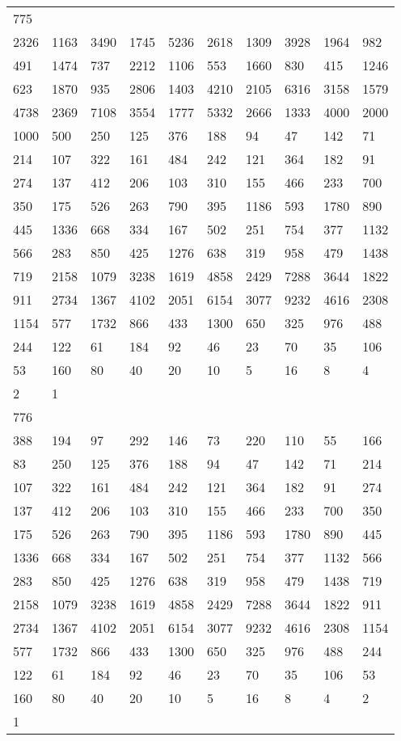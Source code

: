 \begin{longtable}{*{10}{l}}
775&&&&&&&&&\\
2326& 1163& 3490& 1745& 5236& 2618& 1309& 3928& 1964& 982\\
491& 1474& 737& 2212& 1106& 553& 1660& 830& 415& 1246\\
623& 1870& 935& 2806& 1403& 4210& 2105& 6316& 3158& 1579\\
4738& 2369& 7108& 3554& 1777& 5332& 2666& 1333& 4000& 2000\\
1000& 500& 250& 125& 376& 188& 94& 47& 142& 71\\
214& 107& 322& 161& 484& 242& 121& 364& 182& 91\\
274& 137& 412& 206& 103& 310& 155& 466& 233& 700\\
350& 175& 526& 263& 790& 395& 1186& 593& 1780& 890\\
445& 1336& 668& 334& 167& 502& 251& 754& 377& 1132\\
566& 283& 850& 425& 1276& 638& 319& 958& 479& 1438\\
719& 2158& 1079& 3238& 1619& 4858& 2429& 7288& 3644& 1822\\
911& 2734& 1367& 4102& 2051& 6154& 3077& 9232& 4616& 2308\\
1154& 577& 1732& 866& 433& 1300& 650& 325& 976& 488\\
244& 122& 61& 184& 92& 46& 23& 70& 35& 106\\
53& 160& 80& 40& 20& 10& 5& 16& 8& 4\\
2& 1& \\

776&&&&&&&&&\\
388& 194& 97& 292& 146& 73& 220& 110& 55& 166\\
83& 250& 125& 376& 188& 94& 47& 142& 71& 214\\
107& 322& 161& 484& 242& 121& 364& 182& 91& 274\\
137& 412& 206& 103& 310& 155& 466& 233& 700& 350\\
175& 526& 263& 790& 395& 1186& 593& 1780& 890& 445\\
1336& 668& 334& 167& 502& 251& 754& 377& 1132& 566\\
283& 850& 425& 1276& 638& 319& 958& 479& 1438& 719\\
2158& 1079& 3238& 1619& 4858& 2429& 7288& 3644& 1822& 911\\
2734& 1367& 4102& 2051& 6154& 3077& 9232& 4616& 2308& 1154\\
577& 1732& 866& 433& 1300& 650& 325& 976& 488& 244\\
122& 61& 184& 92& 46& 23& 70& 35& 106& 53\\
160& 80& 40& 20& 10& 5& 16& 8& 4& 2\\
1& \\


\end{longtable}
